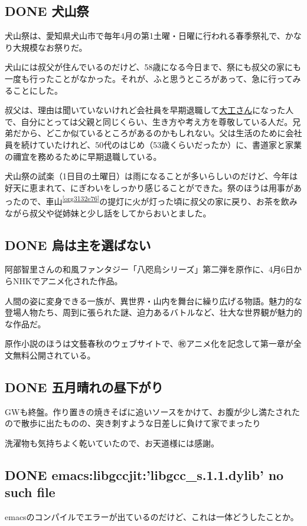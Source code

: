 \documentclass[11pt]{article}
\begin{document}
\subsection{{\bfseries\sffamily DONE} 犬山祭}
\label{sec:orgeccf322}
犬山祭は、愛知県犬山市で毎年4月の第1土曜・日曜に行われる春季祭礼で、かなり大規模なお祭りだ。

犬山には叔父が住んでいるのだけど、58歳になる今日まで、祭にも叔父の家にも一度も行ったことがなかった。それが、ふと思うところがあって、急に行ってみることにした。

叔父は、理由は聞いていないけれど会社員を早期退職して\href{https://gallerykiya.jimdofree.com/kiya工房/}{大工さん}になった人で、自分にとっては父親と同じくらい、生き方や考え方を尊敬している人だ。兄弟だから、どこか似ているところがあるのかもしれない。父は生活のために会社員を続けていたけれど、50代のはじめ（53歳くらいだったか）に、書道家と家業の禰宜を務めるために早期退職している。

犬山祭の試楽（1日目の土曜日）は雨になることが多いらしいのだけど、今年は好天に恵まれて、にぎわいをしっかり感じることができた。祭のほうは用事があったので、車山\textsuperscript{\ref{org3132e76}}の提灯に火が灯った頃に叔父の家に戻り、お茶を飲みながら叔父や従姉妹と少し話をしてからおいとました。
\subsection{{\bfseries\sffamily DONE} 烏は主を選ばない}
\label{sec:org939915c}
阿部智里さんの和風ファンタジー「八咫烏シリーズ」第二弾を原作に、4月6日からNHKでアニメ化された作品。

人間の姿に変身できる一族が、異世界・山内を舞台に繰り広げる物語。魅力的な登場人物たち、周到に張られた謎、迫力あるバトルなど、壮大な世界観が魅力的な作品だ。

原作小説のほうは文藝春秋のウェブサイトで、㊗アニメ化を記念して第一章が全文無料公開されている。
\subsection{{\bfseries\sffamily DONE} 五月晴れの昼下がり}
\label{sec:org20eb316}
GWも終盤。作り置きの焼きそばに追いソースをかけて、お腹が少し満たされたので散歩に出たものの、突き刺すような日差しに負けて家でまったり🥲

洗濯物も気持ちよく乾いていたので、お天道様には感謝。
\subsection{{\bfseries\sffamily DONE} emacs:libgccjit:'libgcc\_s.1.1.dylib' no such file}
\label{sec:org48755d9}
emacsのコンパイルでエラーが出ているのだけど、これは一体どうしたことか。
\end{document}
